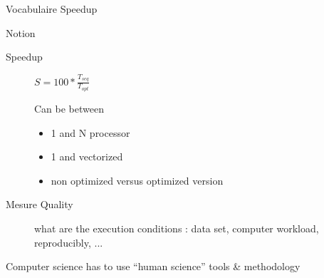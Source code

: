 \begin{Frame}{Vocabulaire Speedup}

  \begin{block}{Notion}
    \begin{description}
    \item[Speedup] $S = 100*\frac{T_{seq}}{T_{opt}}$

      Can be between
      \begin{itemize}
      \item 1 and N processor
      \item 1 and vectorized
      \item non optimized versus optimized version
      \end{itemize}
      
    \item[Mesure Quality] what are the execution conditions : data set,
      computer workload, reproducibly, ...
    \end{description}
    
    Computer science has to use ``human science'' tools \& methodology
  \end{block}
\end{Frame}


